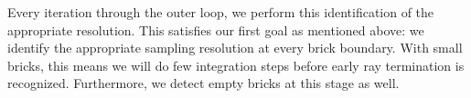 Every iteration through the outer loop, we perform this identification
of the appropriate resolution.  This satisfies our first goal as
mentioned above: we identify the appropriate sampling resolution
at every brick boundary.  With small bricks, this means we will do
few integration steps before early ray termination is recognized.
Furthermore, we detect empty bricks at this stage as well.


% 
% 
% 
% 
 
